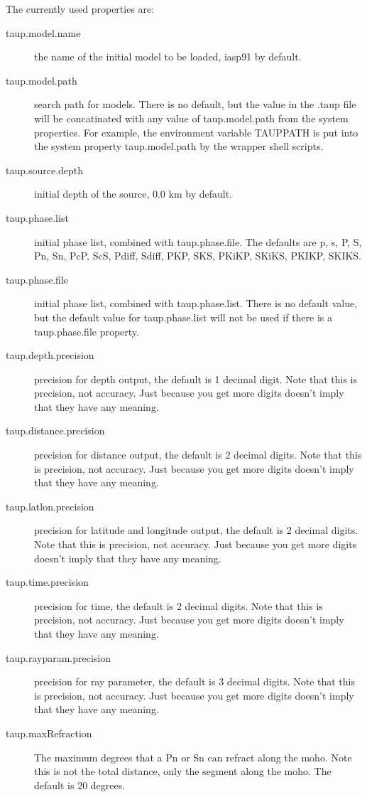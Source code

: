 The currently used properties are:
\begin{description}

\item[taup.model.name] the name of the initial model to be loaded, 
iasp91 by default. 
\item[taup.model.path] search path for models. There is no default, 
but the value
in the .taup file will be concatinated with any value of taup.model.path 
from the system properties. For example, the environment variable TAUPPATH
is put into the system property taup.model.path by the wrapper shell scripts. 
\item[taup.source.depth] initial depth of the source, 0.0 km by default. 
\item[taup.phase.list] initial phase list, combined with taup.phase.file. The
defaults are p, s, P, S, Pn, Sn, PcP, ScS, Pdiff, Sdiff, PKP, SKS, PKiKP, 
SKiKS, PKIKP, SKIKS.  
\item[taup.phase.file] initial phase list, combined with taup.phase.list. There
is no default value, but the default value for taup.phase.list will not be 
used if there is a taup.phase.file property.
\item[taup.depth.precision] precision for depth output, the default is 1 decimal digit.
 Note that this is precision, not accuracy. Just 
because you get more digits doesn't imply that they have any meaning.
\item[taup.distance.precision] precision for distance output, 
the default is 2 decimal digits.
Note that this 
is precision, not accuracy. Just because you get more
digits doesn't imply that they have any meaning.
\item[taup.latlon.precision] precision for latitude and longitude output, the
default is 2 decimal digits. 
Note that this is precision, not accuracy. Just because you get more
digits doesn't imply that they have any meaning.
\item[taup.time.precision] precision for time, the default is 2 decimal digits.
Note that this is precision, not accuracy. Just because you get more
digits doesn't imply that they have any meaning.
\item[taup.rayparam.precision] precision for ray parameter, the default is 3 decimal digits.
Note that this is precision, not accuracy. Just because you get more
 digits doesn't imply that they have any meaning.
\item[taup.maxRefraction] The maximum degrees that a Pn or Sn can refract along the moho. Note this
 is not the total distance, only the segment along the moho. The default is 20 degrees.

\end{description}

